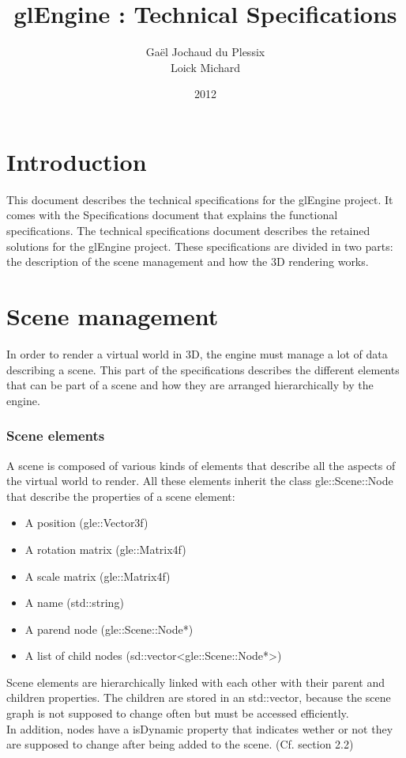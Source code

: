 \documentclass [a4 paper,11pt]{report}
\title {glEngine : Technical Specifications}
\author {Gaël Jochaud du Plessix\\
Loick Michard}
\date {2012}
\begin{document}
\maketitle

\newpage

\tableofcontents

\newpage

\part{Introduction}
This document describes the technical specifications for the glEngine project. It comes with the Specifications document that explains the functional specifications. The technical specifications document describes the retained solutions for the glEngine project. These specifications are divided in two parts: the description of the scene management and how the 3D rendering works.

\part{Scene management}
In order to render a virtual world in 3D, the engine must manage a lot of data describing a scene. This part of the specifications describes the different elements that can be part of a scene and how they are arranged hierarchically by the engine.

\section{Scene elements}
A scene is composed of various kinds of elements that describe all the aspects of the virtual world to render.
All these elements inherit the class gle::Scene::Node that describe the properties of a scene element:
\begin{itemize}
\item A position (gle::Vector3f)
\item A rotation matrix (gle::Matrix4f)
\item A scale matrix (gle::Matrix4f)
\item A name (std::string)
\item A parend node (gle::Scene::Node*)
\item A list of child nodes (sd::vector<gle::Scene::Node*>)
\end{itemize}
Scene elements are hierarchically linked with each other with their parent and children properties. The children are stored in an std::vector, because the scene graph is not supposed to change often but must be accessed efficiently.\\
In addition, nodes have a isDynamic property that indicates wether or not they are supposed to change after being added to the scene. (Cf. section 2.2)
\end{document}

